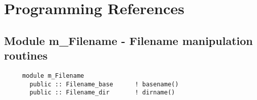 %  
%  
%  
\appendix
{}
 
  
\newpage
%
% 
\section{Programming References} \label{app:ProLogues}
%
  \subsection{Module m\_Filename - Filename manipulation routines }
  
\begin{verbatim} 
     module m_Filename
       public :: Filename_base		! basename()
       public :: Filename_dir		! dirname()
 \end{verbatim}
%
 
